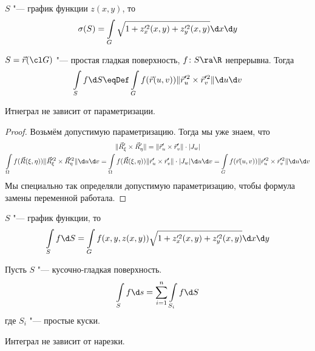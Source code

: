 \begin{conseq}
	$S$ "--- график функции $z(x, y)$, то
	\[
		\sigma(S) = \int\limits_G \sqrt{1 + z_x'^2(x, y) + z_y'^2(x, y)} \d x \d y
	\]
\end{conseq}

\begin{Def}
	$S = \vec r(\cl G)$ "--- простая гладкая поверхность, $f\colon S \ra \R$ непрерывна.
	Тогда
	\[
		\int\limits_S f \d S \eqDef \int\limits_G f(\vec r(u, v)) \| \vec r_u'^2 \times \vec r_v'^2 \| \d u \d v
	\]
\end{Def}

\begin{theorem}
	Итнеграл не зависит от параметризации.
\end{theorem}
\begin{proof}
	Возьмём допустимую параметризацию. Тогда мы уже знаем, что
	\begin{gather*}
		\|\vec R_\xi' \times \vec R_\eta'\| = \|\vec r_u' \times \vec r_v'\| \cdot |J_w| \\
		\int\limits_\Omega f(\vec R(\xi, \eta)) \| \vec R_\xi'^2 \times \vec R_\eta'^2 \| \d u \d v
		= \int\limits_\Omega f(\vec R(\xi, \eta)) \|\vec r_u' \times \vec r_v'\| \cdot |J_w| \d u \d v
		= \int\limits_G f(\vec r(u, v)) \| \vec r_u'^2 \times \vec r_v'^2 \| \d u \d v
	\end{gather*}
	Мы специально так определяли допустимую параметризацию, чтобы формула замены переменной работала.
\end{proof}

\begin{Rem}
	$S$ "--- график функции, то
	\[ \int\limits_S f \d S = \int\limits_G f(x, y, z(x, y)) \sqrt{1 + z_x'^2(x, y) + z_y'^2(x, y)} \d x \d y \]
\end{Rem}

\begin{Def}
	Пусть $S$ "--- кусочно-гладкая поверхность.
	\[ \int\limits_S f \d s = \sum_{i=1}^n \int\limits_{S_i} f \d S \]
	где $S_i$ "--- простые куски.
\end{Def}

\begin{Rem}
	Интеграл не зависит от нарезки.
\end{Rem}